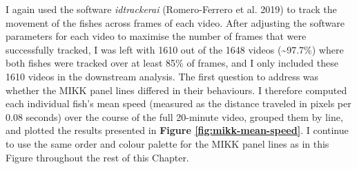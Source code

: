 \documentclass[
]{book}
\begin{document}
I again used the software \emph{idtrackerai} (Romero-Ferrero et al. 2019) to track the movement of the fishes across frames of each video. After adjusting the software parameters for each video to maximise the number of frames that were successfully tracked, I was left with 1610 out of the 1648 videos (\textasciitilde97.7\%) where both fishes were tracked over at least 85\% of frames, and I only included these 1610 videos in the downstream analysis. The first question to address was whether the MIKK panel lines differed in their behaviours. I therefore computed each individual fish's mean speed (measured as the distance traveled in pixels per 0.08 seconds) over the course of the full 20-minute video, grouped them by line, and plotted the results presented in \textbf{Figure \ref{fig:mikk-mean-speed}}. I continue to use the same order and colour palette for the MIKK panel lines as in this Figure throughout the rest of this Chapter.
\end{document}
